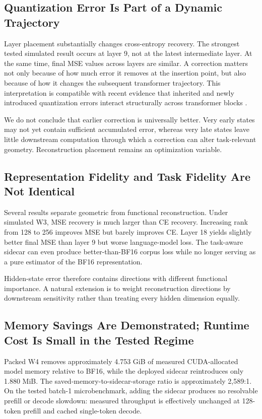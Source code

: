 \documentclass[11pt]{article}
\begin{document}
\subsection{Quantization Error Is Part of a Dynamic Trajectory}

Layer placement substantially changes cross-entropy recovery. The strongest tested simulated result occurs at layer 9, not at the latest intermediate layer. At the same time, final MSE values across layers are similar. A correction matters not only because of how much error it removes at the insertion point, but also because of how it changes the subsequent transformer trajectory. This interpretation is compatible with recent evidence that inherited and newly introduced quantization errors interact structurally across transformer blocks \cite{chen2026why}.

We do not conclude that earlier correction is universally better. Very early states may not yet contain sufficient accumulated error, whereas very late states leave little downstream computation through which a correction can alter task-relevant geometry. Reconstruction placement remains an optimization variable.

\subsection{Representation Fidelity and Task Fidelity Are Not Identical}

Several results separate geometric from functional reconstruction. Under simulated W3, MSE recovery is much larger than CE recovery. Increasing rank from 128 to 256 improves MSE but barely improves CE. Layer 18 yields slightly better final MSE than layer 9 but worse language-model loss. The task-aware sidecar can even produce better-than-BF16 corpus loss while no longer serving as a pure estimator of the BF16 representation.

Hidden-state error therefore contains directions with different functional importance. A natural extension is to weight reconstruction directions by downstream sensitivity rather than treating every hidden dimension equally.

\subsection{Memory Savings Are Demonstrated; Runtime Cost Is Small in the Tested Regime}

Packed W4 removes approximately 4.753 GiB of measured CUDA-allocated model memory relative to BF16, while the deployed sidecar reintroduces only 1.880 MiB. The saved-memory-to-sidecar-storage ratio is approximately 2,589:1. On the tested batch-1 microbenchmark, adding the sidecar produces no resolvable prefill or decode slowdown: measured throughput is effectively unchanged at 128-token prefill and cached single-token decode.
\end{document}
